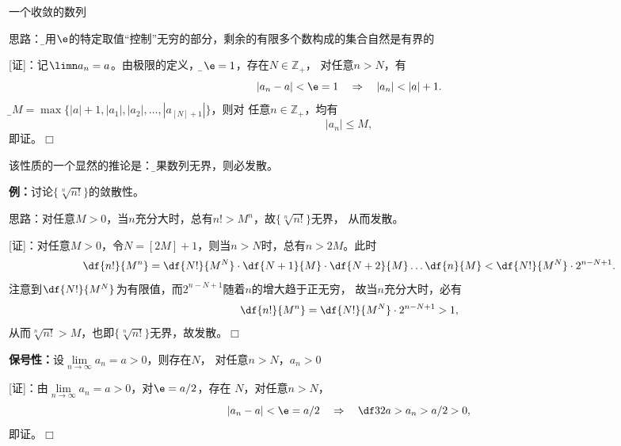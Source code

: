 \begin{center}
	
	一个收敛的数列
\end{center}

思路：{\b 利用$\e$的特定取值“控制”无穷的部分，剩余的有限多个数构成的集合自然是有界的}

[证]：记$\limn a_n=a$。由极限的定义，对{\b$\e=1$}，存在$N\in\mathbb{Z}_+$，
对任意$n>N$，有
$$|a_n-a|<\e=1\quad\Rightarrow\quad |a_n|<|a|+1.$$
记{\b$M=\max\{|a|+1,|a_1|,|a_2|,\ldots,|a_{[N]+1}|\}$}，则对
任意$n\in\mathbb{Z}_+$，均有
$$|a_n|\leq M,$$
即证。\hfill $\Box$

该性质的一个显然的推论是：{\b 如果数列无界，则必发散。}

{\bf 例：}讨论$\{\sqrt[n]{n!}\}$的敛散性。

思路：对任意$M>0$，当$n$充分大时，总有$n!>M^n$，故$\{\sqrt[n]{n!}\}$无界，
从而发散。

[证]：对任意$M>0$，令$N=[2M]+1$，则当$n>N$时，总有$n>2M$。此时
$$\df{n!}{M^n}=\df{N!}{M^N}\cdot\df{N+1}{M}
\cdot\df{N+2}{M}\ldots\df{n}{M}<\df{N!}{M^N}\cdot2^{n-N+1}.$$
注意到$\df{N!}{M^N}$为有限值，而$2^{n-N+1}$随着$n$的增大趋于正无穷，
故当$n$充分大时，必有
$$\df{n!}{M^n}=\df{N!}{M^N}\cdot2^{n-N+1}>1,$$
从而$\sqrt[n]{n!}>M$，也即$\{\sqrt[n]{n!}\}$无界，故发散。\hfill $\Box$

\begin{thx}
	{\bf 保号性：}设$\lim\limits_{n\to\infty}a_n=a>0$，则存在$N$，
	对任意$n>N$，$a_n>0$	
\end{thx}

[证]：由$\lim\limits_{n\to\infty}a_n=a>0$，对$\e=a/2$，存在
$N$，对任意$n>N$，
$$|a_n-a|<\e=a/2\quad\Rightarrow\quad \df32a>a_n>a/2>0,$$
即证。\hfill $\Box$
		
